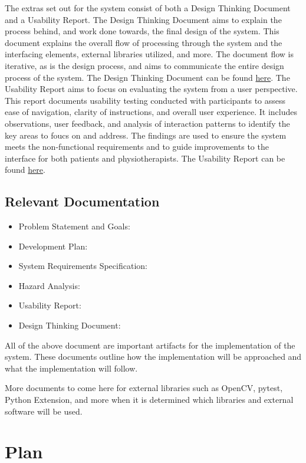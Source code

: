 \documentclass[12pt, titlepage]{article}
\begin{document}
The extras set out for the system consist of both a Design Thinking Document and a Usability Report. The Design Thinking Document aims to explain the process behind, and work done towards, the final design of the system. This document explains the overall flow of processing through the system and the interfacing elements, external libraries utilized, and more. The document flow is iterative, as is the design process, and aims to communicate the entire design process of the system. The Design Thinking Document can be found \href{../Extras/DesignThinking}{here}. The Usability Report aims to focus on evaluating the system from a user perspective. This report documents usability testing conducted with participants to assess ease of navigation, clarity of instructions, and overall user experience. It includes observations, user feedback, and analysis of interaction patterns to identify the key areas to foucs on and address. The findings are used to ensure the system meets the non-functional requirements and to guide improvements to the interface for both patients and physiotherapists. The Usability Report can be found \href{../Extras/UsabilityTesting/UsabilityReport.pdf}{here}.

\subsection{Relevant Documentation}
\begin{itemize}
  \item Problem Statement and Goals: \citet{PS}
  \item Development Plan: \citet{DevPlan}
  \item System Requirements Specification: \citet{SRS}
  \item Hazard Analysis: \citet{HA}
  \item Usability Report: \citet{UsabilityTesting}
  \item Design Thinking Document: \citet{DesignThinking}
\end{itemize}
All of the above document are important artifacts for the implementation of the system. These documents outline how the implementation will be approached and what the implementation will  follow.

More documents to come here for external libraries such as OpenCV, pytest, Python Extension, and more when it is determined which libraries and external software will be used.

\section{Plan}
\end{document}
